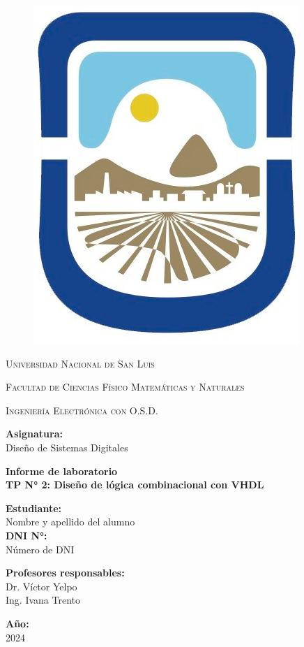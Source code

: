 \documentclass{article}
\begin{document}
	
	\begin{titlepage}	  
		\centering
		
		\begin{figure}
			\centering
			\includegraphics[width=0.15\linewidth]{logo-unsl.jpg}
		\end{figure}    
		
		{\scshape\LARGE Universidad Nacional de San Luis\par}
		{\scshape Facultad de Ciencias Físico Matemáticas y Naturales\par}
		{\scshape Ingeniería Electrónica con O.S.D.\par}
		\bigskip 
		\bigskip 
		\bigskip 
		
		\Large \textbf {Asignatura:\\} 
		\LARGE Diseño de Sistemas Digitales	
		\bigskip 
		\bigskip 
		\bigskip
		\bigskip
		
		\LARGE \textbf {Informe de laboratorio\\}
		\LARGE \textbf {TP N° 2: Diseño de lógica combinacional con VHDL}
		
		\bigskip
		\bigskip
		\bigskip
		
		\LARGE \textbf {Estudiante:\\} 
		\LARGE Nombre y apellido del alumno\\
		\bigskip
		\Large \textbf {DNI N°:\\} 
		\Large Número de DNI	
		
		\bigskip
		\bigskip
		\bigskip
		\bigskip
		\bigskip
		\bigskip
		
		\Large \textbf {Profesores responsables:\\} 
		\Large Dr. Víctor Yelpo \\ Ing. Ivana Trento
		
		\bigskip
		\bigskip
		\bigskip
		\bigskip
		\bigskip
		\bigskip
		\bigskip
		\bigskip
		\bigskip
		
		\Large \textbf {Año:\\} 
		\Large 2024	
	\end{titlepage}
	\newpage
	
	
	
	
	
	
	

	
\end{document}

